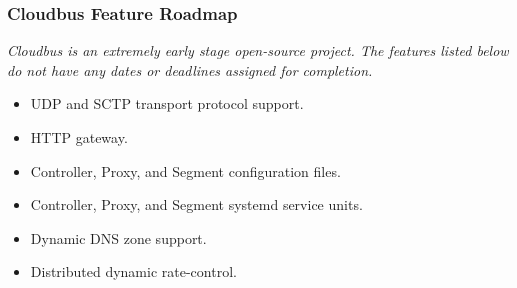 \begin{frame}
	\frametitle{Cloudbus Feature Roadmap}
	\emph{Cloudbus is an extremely early stage open-source project. The features listed below do not have any dates or deadlines assigned for 
	completion.}\vspace{1em}
	\small
	\begin{itemize}
		\item UDP and SCTP transport protocol support.
		\item HTTP gateway.
		\item Controller, Proxy, and Segment configuration files.
		\item Controller, Proxy, and Segment systemd service units.
		\item Dynamic DNS zone support.
		\item Distributed dynamic rate-control.
	\end{itemize}
	\normalsize
\end{frame}